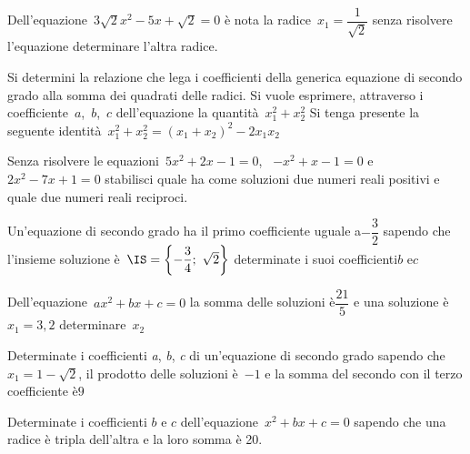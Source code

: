 \begin{esercizio}
\label{ese:3.69}
Dell'equazione~\(3 \sqrt{2} x^{2}-5 x + \sqrt{2} = 0\) 
è nota la radice~\(x_{1} = \dfrac{1}{\sqrt{2}}\) 
senza risolvere l'equazione determinare l'altra radice.
\end{esercizio}

\begin{esercizio}
\label{ese:3.70}
Si determini la relazione che lega i coefficienti della generica equazione 
di secondo grado alla somma dei quadrati delle radici. Si vuole esprimere,
attraverso i coefficiente~\(a\),~\(b\),~\(c\) dell'equazione la 
quantità~\(x_{1}^{2} + x_{2}^{2}\) 
Si tenga presente la seguente identità~\(x_{1}^{2} + x_{2}^{2} = 
(x_{1} + x_{2} )^{2}-2 x_{1} x_{2}\)
\end{esercizio}

\begin{esercizio}
\label{ese:3.71}
Senza risolvere le equazioni~\(5 x^{2} + 2 x-1 = 0\), 
~\(-x^{2} + x-1 = 0\) e~\(2 x^{2}-7 x +1 = 0\) stabilisci quale ha come 
soluzioni due numeri reali positivi e quale due numeri reali reciproci.
\end{esercizio}

\begin{esercizio}
\label{ese:3.72}
Un'equazione di secondo grado ha il primo coefficiente uguale a\(- 
\dfrac{3}{2}\) 
sapendo che l'insieme soluzione è~\(\IS = \left\{-\dfrac{3}{4};~\sqrt{2} 
\right\}\)
determinate i suoi coefficienti\(b\) e\(c\)
\end{esercizio}

\begin{esercizio}
\label{ese:3.73}
Dell'equazione~\(a x^{2} + b x + c = 0\) la somma delle soluzioni 
è\(\dfrac{21}{5}\) e una soluzione è~\(x_{1} = 3,2\) determinare~\(x_{2}\)
\end{esercizio}

\begin{esercizio}
\label{ese:3.74}
Determinate i coefficienti \emph{a}, \emph{b}, \emph{c} di un'equazione 
di secondo grado sapendo che~\(x_{1} = 1-\sqrt{2}\), il prodotto delle 
soluzioni è~\(-1\) e la somma del secondo con il terzo coefficiente è\(9\)
\end{esercizio}

\begin{esercizio}
\label{ese:3.75}
Determinate i coefficienti \(b\) e \(c\) 
dell'equazione~\(x^{2} + b x + c = 0\) 
sapendo che una radice è tripla dell'altra e la loro somma è 20.
\end{esercizio}

